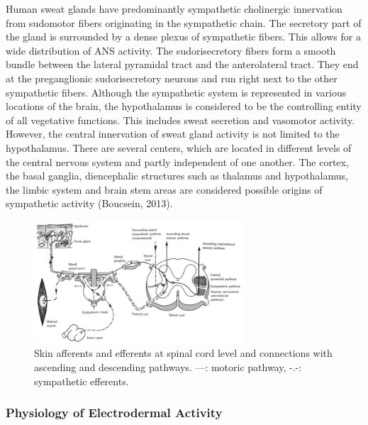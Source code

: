 Human sweat glands have predominantly sympathetic cholinergic innervation from sudomotor fibers originating in the sympathetic chain. The secretory part of the gland is surrounded by a dense plexus of sympathetic fibers. This allows for a wide distribution of ANS activity. The sudorisecretory fibers form a smooth bundle between the lateral pyramidal tract and the anterolateral tract. They end at the preganglionic sudorisecretory neurons and run right next to the other sympathetic fibers.  Although the sympathetic system is represented in various locations of the brain, the hypothalamus is considered to be the controlling entity of all vegetative functions. This includes sweat secretion and vasomotor activity. However, the central innervation of sweat gland activity is not limited to the hypothalamus. There are several centers, which are located in different levels of the central nervous system and partly independent of one another. The cortex, the basal ganglia, diencephalic structures such as thalamus and hypothalamus, the limbic system and brain stem areas are considered possible origins of sympathetic activity (Boucsein, 2013).

\begin{figure}[ht]
\centering
\includegraphics[width=0.7\textwidth]{images/symPathway.png}
\caption{Skin afferents and efferents at spinal cord level and connections with ascending and descending pathways. ---: motoric pathway, -.-: sympathetic efferents. \citep{boucsein2013electrodermal}}
\label{symPathImg}
\end{figure}

\subsubsection{Physiology of Electrodermal Activity}

